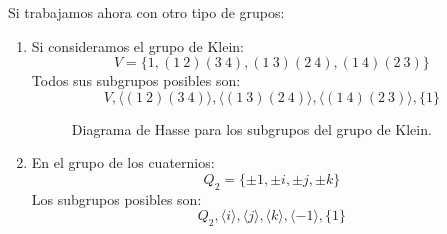 \begin{ejemplo}
    Si trabajamos ahora con otro tipo de grupos:
    \begin{enumerate}
        \item Si consideramos el grupo de Klein:
            \begin{equation*}
                V = \{1, (1\ 2)(3\ 4), (1\ 3)(2\ 4), (1\ 4)(2\ 3)\}
            \end{equation*}
            Todos sus subgrupos posibles son:
            \begin{equation*}
                V, \langle (1\ 2)(3\ 4) \rangle , \langle (1\ 3)(2\ 4) \rangle , \langle (1\ 4)(2\ 3) \rangle , \{1\}
            \end{equation*}

            \begin{figure}[H]
                \centering
                \caption{Diagrama de Hasse para los subgrupos del grupo de Klein.}
                \label{fig:hasse_klein}
            \end{figure}

        \item En el grupo de los cuaternios:
            \begin{equation*}
                Q_2 = \{\pm 1,\pm i, \pm j, \pm k\}
            \end{equation*}
            Los subgrupos posibles son:
            \begin{equation*}
                Q_2, \langle i \rangle , \langle j \rangle , \langle k \rangle , \langle -1 \rangle , \{1\}
            \end{equation*}


\end{enumerate}
\end{ejemplo}

